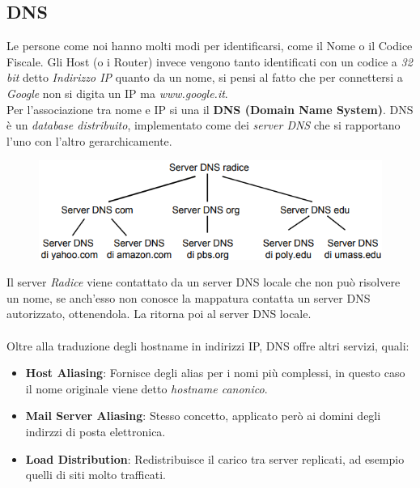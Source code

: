 \documentclass{article}
\begin{document}
        \subsection{DNS}
            Le persone come noi hanno molti modi per identificarsi, come il Nome o il Codice Fiscale. Gli Host (o i Router) invece vengono tanto identificati con un codice a \textit{32 bit} detto \textit{Indirizzo IP} quanto da un nome, si pensi al fatto che per connettersi a \textit{Google} non si digita un IP ma \textit{www.google.it}.\\
            Per l'associazione tra nome e IP si una il \textbf{DNS (Domain Name System)}. DNS è un \textit{database distribuito}, implementato come dei \textit{server DNS} che si rapportano l'uno con l'altro gerarchicamente.\\
            \begin{figure}[H]
                \centering
                \includegraphics[width=\textwidth]{pic/gerarchia_dns.png}
                \label{Gerarchia dei Server DNS}
            \end{figure}
            Il server \textit{Radice} viene contattato da un server DNS locale che non può risolvere un nome, se anch'esso non conosce la mappatura contatta un server DNS autorizzato, ottenendola. La ritorna poi al server DNS locale.\\
            \\
            Oltre alla traduzione degli hostname in indirizzi IP, DNS offre altri servizi, quali:
            \begin{itemize}
                \item \textbf{Host Aliasing}: Fornisce degli alias per i nomi più complessi, in questo caso il nome originale viene detto \textit{hostname canonico}.
                \item \textbf{Mail Server Aliasing}: Stesso concetto, applicato però ai domini degli indirzzi di posta elettronica.
                \item \textbf{Load Distribution}: Redistribuisce il carico tra server replicati, ad esempio quelli di siti molto trafficati.
            \end{itemize}
\end{document}
